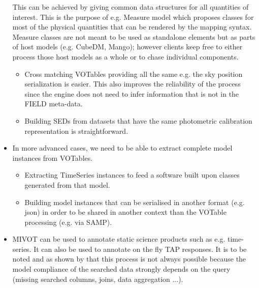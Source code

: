 \begin{itemize}
  This can be achieved by giving  common data structures for all 
  quantities of interest. This is the purpose of e.g. Measure model 
  which proposes classes for most of the physical quantities that can 
  be rendered by the mapping syntax. Measure classes are not meant to 
  be used as standalone elements but as parts of host models 
  (e.g. CubeDM, Mango);
  however clients keep free to either process those host models as a
  whole or to chase individual components.
    \begin{itemize}
      \item Cross matching VOTables providing all the same e.g. the sky position serialization is easier.
            This also improves the reliability of the process since the engine does not need to infer information that is not in the FIELD meta-data.
      \item Building SEDs from datasets that have the same photometric calibration representation is straightforward.
   \end{itemize}          

  \item In more advanced cases, we need to be able to extract complete model instances from VOTables.
    \begin{itemize}
      \item Extracting  TimeSeries instances to feed a software built upon classes generated from that model.
      \item Building model instances that can be serialised in another format (e.g. json) in order to be shared in another context than 
            the VOTable processing (e.g. via SAMP).
   \end{itemize}         
    
   \item MIVOT can be used to annotate static science products such as e.g. time-series. It can also be used to annotate 
   on the fly TAP responses.
   It is to be noted and as shown by \cite{2201.01732}  that this process is not always 
   possible because the model compliance of the searched data strongly depends 
   on the query (missing searched columns, joins, data aggregation ...). 
   
    
\end{itemize} 

